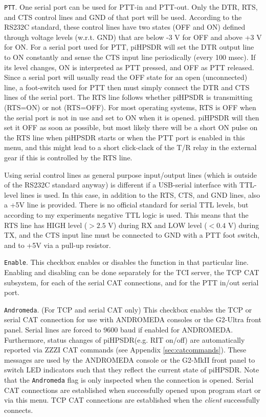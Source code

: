 \documentclass[12pt]{book}
\def\rett#1{\texttt{\color{red}#1}}
\def\pH{pi\-HPSDR\xspace}
\begin{document}
\rett{PTT}. One serial port can be used for PTT-in and PTT-out. Only the DTR, RTS, and CTS control lines
and GND of that port will be used. According to the RS232C standard, these control lines have two states
(OFF and ON) defined through voltage levels (w.r.t. GND) that are below -3 V for OFF and above +3 V for
ON. For a serial port used for PTT, \pH will set the DTR output line to ON constantly and sense the
CTS input line periodically (every 100 msec). If its level changes, ON is interpreted as PTT pressed,
and OFF as PTT released. Since a serial port will usually read the OFF state for an open (unconnected)
line, a foot-switch used for PTT then must simply connect the DTR and CTS lines of the serial port.
The RTS line follows whether \pH is transmitting (RTS=ON) or not (RTS=OFF). For most operating systems,
RTS is OFF when the serial port is not in use and set to ON when it is opened. \pH will then set it
OFF as soon as possible, but most likely there will be a short ON pulse on the RTS line when \pH starts
or when the PTT port is enabled in this menu, and this might lead to a short click-clack of
the T/R relay in the external gear if this is controlled by the RTS line.

Using serial control lines as general purpose input/output lines (which is outside of the RS232C
standard anyway) is  different if a USB-serial interface with TTL-level lines is used.
In this case, in addition to the RTS, CTS, and GND lines, also a +5V line is provided. There is no
official standard for serial TTL levels, but according to my experiments negative TTL logic is used.
This means that the RTS line has HIGH level ($> 2.5$ V) during RX and LOW level ($< 0.4$ V) during TX,
and the CTS input line must be connected to GND with a PTT foot switch, and to +5V via a pull-up
resistor.

\rett{Enable}. This checkbox enables or disables the function in that particular line.
Enabling and disabling can be done separately for the TCI server, the TCP CAT subsystem,
for each of the serial CAT connections, and for the PTT in/out serial port.

\rett{Andromeda}. (For TCP and serial CAT only)
This checkbox enables the TCP or  serial CAT connection for use with ANDROMEDA consoles
or the G2-Ultra front panel. Serial lines are
forced to 9600 baud if enabled for ANDROMEDA. Furthermore, status changes of \pH (e.g. RIT on/off) are
automatically reported via ZZZI CAT commands (see Appendix \ref{sec:catcommands}). These messages are
used by the ANDROMEDA console or the G2-MkII front panel
to switch LED indicators such that they reflect the current state
of \pH. Note that the \rett{Andromeda} flag is only inspected when the connection is opened. Serial CAT connections
are established when successfully opened upon program start or via this menu.
TCP CAT connections are established when the \textit{client} successfully connects.
\end{document}
